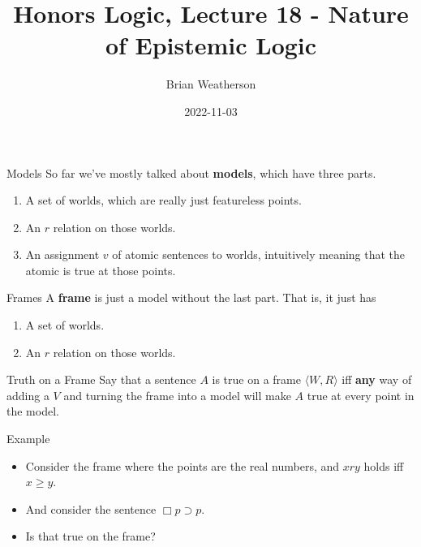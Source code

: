 \documentclass[
  14pt,
  letterpaper,
  ignorenonframetext,
]{beamer}
\title{Honors Logic, Lecture 18 - Nature of Epistemic Logic}
\author{Brian Weatherson}
\date{2022-11-03}
\providecommand{\tightlist}{%
  \setlength{\itemsep}{0pt}\setlength{\parskip}{0pt}}\usepackage{longtable,booktabs,array}
\begin{document}
\frame{\titlepage}
\ifdefined\Shaded\renewenvironment{Shaded}{\begin{tcolorbox}[sharp corners, enhanced, borderline west={3pt}{0pt}{shadecolor}, interior hidden, breakable, boxrule=0pt, frame hidden]}{\end{tcolorbox}}\fi

\begin{frame}{Models}
\protect\hypertarget{models}{}
So far we've mostly talked about \textbf{models}, which have three
parts.

\begin{enumerate}
\tightlist
\item
  A set of worlds, which are really just featureless points.
\item
  An \(r\) relation on those worlds.
\item
  An assignment \(v\) of atomic sentences to worlds, intuitively meaning
  that the atomic is true at those points.
\end{enumerate}
\end{frame}

\begin{frame}{Frames}
\protect\hypertarget{frames}{}
A \textbf{frame} is just a model without the last part. That is, it just
has

\begin{enumerate}
\tightlist
\item
  A set of worlds.
\item
  An \(r\) relation on those worlds.
\end{enumerate}
\end{frame}

\begin{frame}{Truth on a Frame}
\protect\hypertarget{truth-on-a-frame}{}
Say that a sentence \(A\) is true on a frame \(\langle W, R \rangle\)
iff \textbf{any} way of adding a \(V\) and turning the frame into a
model will make \(A\) true at every point in the model.
\end{frame}

\begin{frame}{Example}
\protect\hypertarget{example}{}
\begin{itemize}
\tightlist
\item
  Consider the frame where the points are the real numbers, and \(xry\)
  holds iff \(x \geq y\).
\item
  And consider the sentence \(\Box p \supset p\).
\item
  Is that true on the frame?
\end{itemize}
\end{frame}
\end{document}
